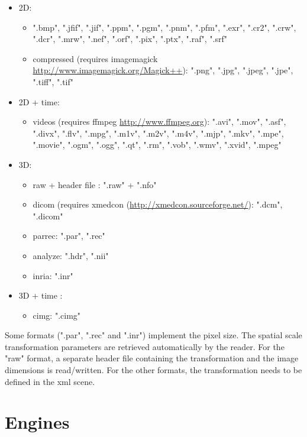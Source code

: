 \begin{itemize}
\item 2D:
	\begin{itemize}
	\item ".bmp", ".jfif", ".jif", ".ppm", ".pgm", ".pnm", ".pfm", ".exr", ".cr2", ".crw", ".dcr", ".mrw", ".nef", ".orf", ".pix", ".ptx", ".raf", ".srf"
	\item compressed (requires imagemagick \url{http://www.imagemagick.org/Magick++}): ".png", ".jpg", ".jpeg", ".jpe", ".tiff", ".tif"
	\end{itemize}
\item 2D + time:
	\begin{itemize}
	\item videos (requires ffmpeg \url{http://www.ffmpeg.org}): ".avi", ".mov", ".asf", ".divx", ".flv", ".mpg", ".m1v", ".m2v", ".m4v", ".mjp", ".mkv", ".mpe", ".movie", ".ogm", ".ogg", ".qt", ".rm", ".vob", ".wmv", ".xvid", ".mpeg"	
	\end{itemize}
\item 3D:
	\begin{itemize}
	\item raw + header file : ".raw" + ".nfo"
	\item dicom (requires xmedcon (\url{http://xmedcon.sourceforge.net/}): ".dcm", ".dicom"
	\item parrec: ".par", ".rec"
	\item analyze: ".hdr", ".nii"
	\item inria: ".inr"
	\end{itemize}
\item 3D + time :
	\begin{itemize}
	\item cimg: ".cimg"
	\end{itemize}
\end{itemize}

\noindent Some formats (".par", ".rec" and ".inr") implement the pixel size. The spatial scale transformation parameters are retrieved automatically by the reader. For the "raw" format, a separate header file containing the transformation and the image dimensions is read/written. For the other formats, the transformation needs to be defined in the xml scene.

\section{Engines}

